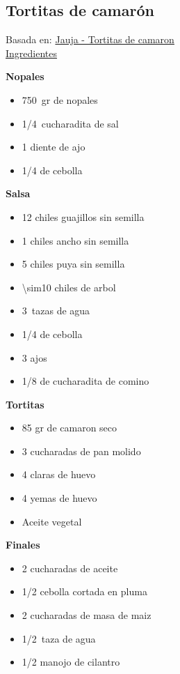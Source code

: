 \subsection{Tortitas de camarón}

Basada en: \href{https://www.youtube.com/watch?v=aD8jlQKKBWQ}{Jauja - Tortitas de camaron} \\

\underline{Ingredientes}

\textbf{Nopales}
\begin{itemize}
\item \SI{750}{gr} de nopales
\item \SI{1/4}{cucharadita} de sal
\item 1 diente de ajo
\item \num{1/4} de cebolla
\end{itemize}

\textbf{Salsa}
\begin{itemize}
\item 12 chiles guajillos sin semilla
\item 1 chiles ancho sin semilla
\item 5 chiles puya sin semilla
\item \num{\sim10} chiles de arbol
\item \SI{3}{tazas} de agua
\item \num{1/4} de cebolla
\item 3 ajos
\item \num{1/8} de cucharadita de comino
\end{itemize}

\textbf{Tortitas}
\begin{itemize}
\item 85 gr de camaron seco
\item 3 cucharadas de pan molido
\item 4 claras de huevo
\item 4 yemas de huevo
\item Aceite vegetal
\end{itemize}

\textbf{Finales}
\begin{itemize}
\item 2 cucharadas de aceite
\item \num{1/2} cebolla cortada en pluma
\item 2 cucharadas de masa de maiz
\item \SI{1/2}{taza} de agua
\item \num{1/2} manojo de cilantro
\end{itemize}

